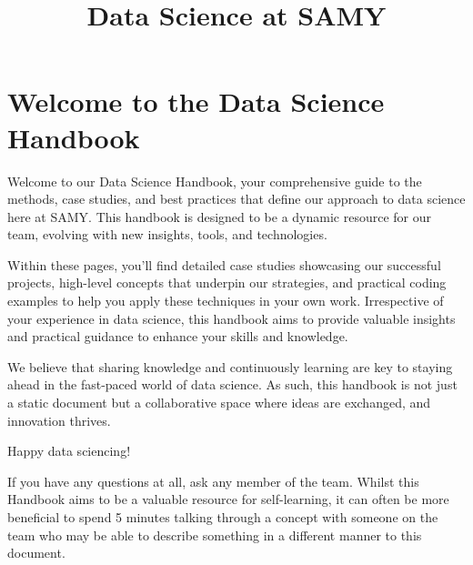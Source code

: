 \documentclass[
  letterpaper,
  DIV=11,
  numbers=noendperiod]{scrreprt}
\title{Data Science at SAMY}
\author{}
\date{}
\renewcommand*\contentsname{Table of contents}
\newcommand\contentsname{Table of contents}
\begin{document}
\maketitle

\renewcommand*\contentsname{Table of contents}
{
\hypersetup{linkcolor=}
\setcounter{tocdepth}{2}
\tableofcontents
}

\chapter{Welcome to the Data Science
Handbook}\label{welcome-to-the-data-science-handbook}

Welcome to our Data Science Handbook, your comprehensive guide to the
methods, case studies, and best practices that define our approach to
data science here at SAMY. This handbook is designed to be a dynamic
resource for our team, evolving with new insights, tools, and
technologies.

Within these pages, you'll find detailed case studies showcasing our
successful projects, high-level concepts that underpin our strategies,
and practical coding examples to help you apply these techniques in your
own work. Irrespective of your experience in data science, this handbook
aims to provide valuable insights and practical guidance to enhance your
skills and knowledge.

We believe that sharing knowledge and continuously learning are key to
staying ahead in the fast-paced world of data science. As such, this
handbook is not just a static document but a collaborative space where
ideas are exchanged, and innovation thrives.

Happy data sciencing!

\begin{tcolorbox}[enhanced jigsaw, colback=white, opacitybacktitle=0.6, coltitle=black, left=2mm, breakable, bottomtitle=1mm, toptitle=1mm, toprule=.15mm, colframe=quarto-callout-note-color-frame, titlerule=0mm, title=\textcolor{quarto-callout-note-color}{\faInfo}\hspace{0.5em}{Note}, colbacktitle=quarto-callout-note-color!10!white, rightrule=.15mm, bottomrule=.15mm, arc=.35mm, opacityback=0, leftrule=.75mm]

If you have any questions at all, ask any member of the team. Whilst
this Handbook aims to be a valuable resource for self-learning, it can
often be more beneficial to spend 5 minutes talking through a concept
with someone on the team who may be able to describe something in a
different manner to this document.

\end{tcolorbox}
\end{document}
